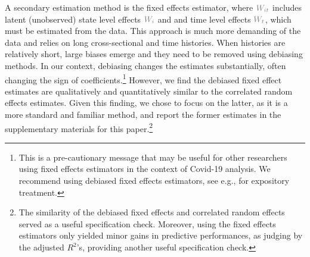 \documentclass[11pt,reqno,letter]{amsart}
\theoremstyle{definition}
\def\wcolor{\color{gray}}
\begin{document}
A secondary estimation method is the fixed effects estimator, where ${\wcolor W_{it}}$ includes
latent (unobserved) state level effects ${\wcolor W_i}$ and  and time level effects ${\wcolor W_t}$,
which must be estimated from the data.  This approach is much more demanding of the data and relies on long cross-sectional
and time histories. When histories are relatively short,  large biases emerge and
they need to be removed using debiasing methods. In our context, debiasing
  changes the estimates substantially, often changing the sign of coefficients.\footnote{This is a pre-cautionary
message that may be useful for other researchers using fixed effects estimators in the context
of Covid-19 analysis. We recommend using debiased fixed effects estimators, see e.g., \cite{chen2019mastering}
for expository treatment. }
However, we find the debiased fixed effect estimates are
qualitatively and quantitatively similar to the correlated random effects estimates.
Given this finding, we chose to focus on the latter, as it is a more standard and familiar method, and report the former
estimates in the supplementary materials for this paper.\footnote{The similarity of the debiased fixed
effects and correlated random effects served as a useful specification check. Moreover, using the fixed
effects estimators only yielded minor gains in predictive performances, as judging by the adjusted
$R^2$'s, providing another useful specification check.}
\end{document}
